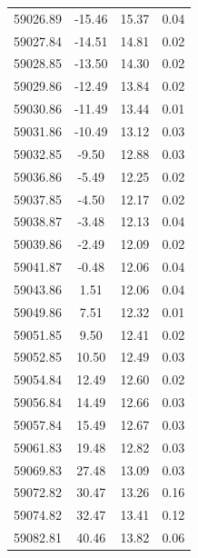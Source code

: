 \begin{longtable}{|c|c|c|c|}
 59026.89 &  -15.46 &       15.37 &          0.04 \\
 59027.84 &  -14.51 &       14.81 &          0.02 \\
 59028.85 &  -13.50 &       14.30 &          0.02 \\
 59029.86 &  -12.49 &       13.84 &          0.02 \\
 59030.86 &  -11.49 &       13.44 &          0.01 \\
 59031.86 &  -10.49 &       13.12 &          0.03 \\
 59032.85 &   -9.50 &       12.88 &          0.03 \\
 59036.86 &   -5.49 &       12.25 &          0.02 \\
 59037.85 &   -4.50 &       12.17 &          0.02 \\
 59038.87 &   -3.48 &       12.13 &          0.04 \\
 59039.86 &   -2.49 &       12.09 &          0.02 \\
 59041.87 &   -0.48 &       12.06 &          0.04 \\
 59043.86 &    1.51 &       12.06 &          0.04 \\
 59049.86 &    7.51 &       12.32 &          0.01 \\
 59051.85 &    9.50 &       12.41 &          0.02 \\
 59052.85 &   10.50 &       12.49 &          0.03 \\
 59054.84 &   12.49 &       12.60 &          0.02 \\
 59056.84 &   14.49 &       12.66 &          0.03 \\
 59057.84 &   15.49 &       12.67 &          0.03 \\
 59061.83 &   19.48 &       12.82 &          0.03 \\
 59069.83 &   27.48 &       13.09 &          0.03 \\
 59072.82 &   30.47 &       13.26 &          0.16 \\
 59074.82 &   32.47 &       13.41 &          0.12 \\
 59082.81 &   40.46 &       13.82 &          0.06 \\
\hline
\end{longtable}